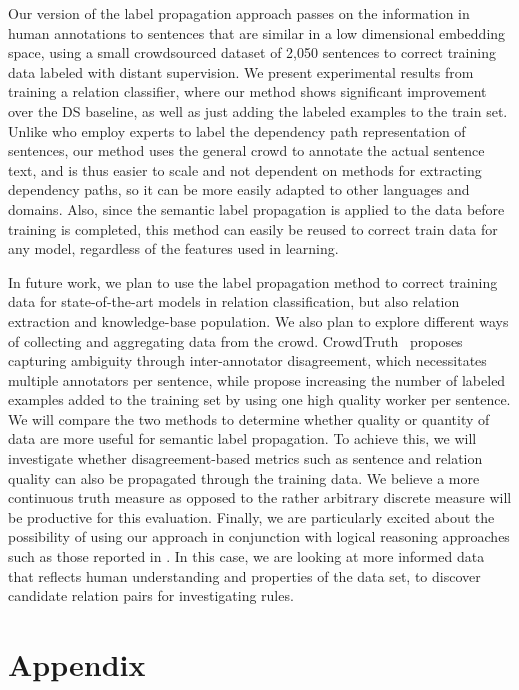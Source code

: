 Our version of the label propagation approach passes on the information in human annotations to sentences that are similar in a low dimensional embedding space, using a small crowdsourced dataset of 2,050 sentences to correct training data labeled with distant supervision.  We present experimental results from training a relation classifier, where our method shows significant improvement over the DS baseline, as well as just adding the labeled examples to the train set. Unlike \citet{sterckx2016knowledge} who employ experts to label the dependency path representation of sentences, our method uses the general crowd to annotate the actual sentence text, and is thus easier to scale and not dependent on methods for extracting dependency paths, so it can be more easily adapted to other languages and domains.  Also, since the semantic label propagation is applied to the data before training is completed, this method can easily be reused to correct train data for any model, regardless of the features used in learning.

In future work, we plan to use the label propagation method to correct training data for state-of-the-art models in relation classification, but also relation extraction and knowledge-base population. We also plan to explore different ways of collecting and aggregating data from the crowd. CrowdTruth~\cite{dumitrache2017false} proposes capturing ambiguity through inter-annotator disagreement, which necessitates multiple annotators per sentence, while \citet{liu2016effective} propose increasing the number of labeled examples added to the training set by using one high quality worker per sentence. We will compare the two methods to determine whether quality or quantity of data are more useful for semantic label propagation. To achieve this, we will investigate whether disagreement-based metrics such as sentence and relation quality can also be propagated through the training data. We believe a more continuous truth measure as opposed to the rather arbitrary discrete measure will be productive for this evaluation. Finally, we are particularly excited about the possibility of using our approach in conjunction with logical reasoning approaches such as those reported in \cite{demeester2016regularizing}.  In this case, we are looking at more informed data that reflects human understanding and properties of the data set, to discover candidate relation pairs for investigating rules. 

\newpage

\section*{Appendix}
\label{sec:appendix4.1}

